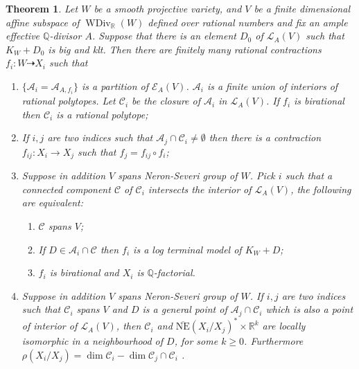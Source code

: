 \documentclass[11pt]{amsart}
\newtheorem{thm}[defn]{Theorem}
\begin{document}
\begin{thm}\label{mapbetweenAM}
  \cite[Theorem 3.3]{haconSarkisovProgram2012} Let $W$ be a smooth projective   variety, and  $ V $ be a finite dimensional affine subspace of $ \operatorname{WDiv}_{\mathbb{R}}(W) $ defined over rational numbers and fix an ample effective $\mathbb{Q}$-divisor $A$. Suppose that there is an element $D_{0}$ of $\mathcal{L}_{A}(V)$ such that $K_{W}+D_{0}$ is big and klt. Then there are finitely many rational contractions $ f_i:W\dashrightarrow X_i $ such that
  \begin{enumerate}
    \item $ \{\mathcal{A}_i=\mathcal{A}_{A,f_i}\} $ is a partition of $ \mathcal{E}_{A}(V) $. $ \mathcal{A}_i $ is a finite union of interiors of rational polytopes.  Let $\mathcal{C}_{i}$ be the closure of $\mathcal{A}_{i}$ in $\mathcal{L}_{A}(V)$. If $ f_i $ is birational then $ \mathcal{C}_i$ is a rational polytope;
    \item If $ i,j $ are two indices such that $ \mathcal{A}_j\cap \mathcal{C}_i\neq \emptyset $ then there is a contraction $ f_{ij}:X_i\to X_j $ such that $ f_j=f_{ij}\circ f_i $;
    \item Suppose in addition $ V $ spans Neron-Severi group of $W$. Pick $ i $ such that a connected component $ \mathcal{C} $ of $ \mathcal{C}_i $ intersects the interior of $ \mathcal{L}_A(V) $, the following are equivalent:
    \begin{enumerate} 
      \item $ \mathcal{C} $ spans $ V $;
      \item If $ D\in \mathcal{A}_i\cap \mathcal{C} $ then $ f_i $ is a log terminal model of $ K_W+D $;
      \item $ f_i $ is birational and $ X_i $ is $ \mathbb{Q} $-factorial.
    \end{enumerate}
    \item Suppose in addition $ V $ spans Neron-Severi group of $W$. If $ i,j $ are two indices such that $ \mathcal{C}_i $ spans $ V $ and $ D $ is a general point of $ \mathcal{A}_j\cap \mathcal{C}_i $ which is also a point of interior of $ \mathcal{L}_A(V) $, then $ \mathcal{C}_i $ and $ \overline{\mathrm{NE}}(X_i/X_j)^*\times \mathbb{R}^k $ are locally isomorphic in a neighbourhood of $D$,  for some $ k\geqslant 0 $. Furthermore $ \rho(X_i/X_j)=\dim  \mathcal{C}_i-\dim \mathcal{C}_j\cap \mathcal{C}_i   $ .
  \end{enumerate}
\end{thm}
\end{document}
